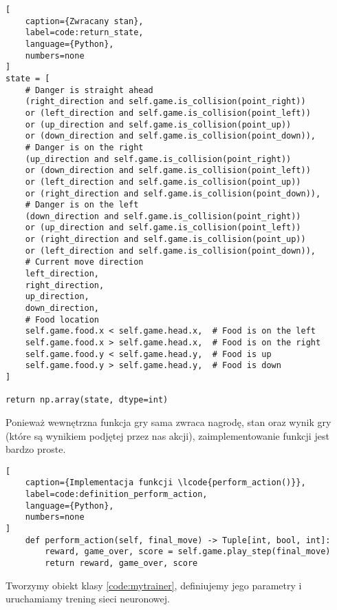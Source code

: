 \begin{onepage}
    \begin{lstlisting}[
    caption={Zwracany stan},
    label=code:return_state,
    language={Python},
    numbers=none
]
state = [
    # Danger is straight ahead
    (right_direction and self.game.is_collision(point_right))
    or (left_direction and self.game.is_collision(point_left))
    or (up_direction and self.game.is_collision(point_up))
    or (down_direction and self.game.is_collision(point_down)),
    # Danger is on the right
    (up_direction and self.game.is_collision(point_right))
    or (down_direction and self.game.is_collision(point_left))
    or (left_direction and self.game.is_collision(point_up))
    or (right_direction and self.game.is_collision(point_down)),
    # Danger is on the left
    (down_direction and self.game.is_collision(point_right))
    or (up_direction and self.game.is_collision(point_left))
    or (right_direction and self.game.is_collision(point_up))
    or (left_direction and self.game.is_collision(point_down)),
    # Current move direction
    left_direction,
    right_direction,
    up_direction,
    down_direction,
    # Food location
    self.game.food.x < self.game.head.x,  # Food is on the left
    self.game.food.x > self.game.head.x,  # Food is on the right
    self.game.food.y < self.game.head.y,  # Food is up
    self.game.food.y > self.game.head.y,  # Food is down
]

return np.array(state, dtype=int)
    \end{lstlisting}
\end{onepage}

\clearpage

Ponieważ wewnętrzna funkcja  gry sama zwraca nagrodę, stan oraz wynik gry (które są wynikiem podjętej przez nas akcji), zaimplementowanie funkcji  jest bardzo proste.


\begin{onepage}
    \begin{lstlisting}[
    caption={Implementacja funkcji \lcode{perform_action()}},
    label=code:definition_perform_action,
    language={Python},
    numbers=none
]
    def perform_action(self, final_move) -> Tuple[int, bool, int]:
        reward, game_over, score = self.game.play_step(final_move)
        return reward, game_over, score
    \end{lstlisting}
\end{onepage}


Tworzymy obiekt klasy  \ref{code:mytrainer}, definiujemy jego parametry i uruchamiamy trening sieci neuronowej.

